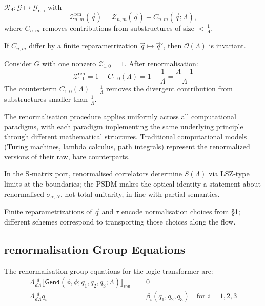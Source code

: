 \begin{definition}
\label{def:R-map}
$\mathcal{R}_\Lambda: \mathcal{G} \mapsto \mathcal{G}_{\text{ren}}$ with
\[
\mathcal{Z}_{n,m}^{\text{ren}}(\vec{q}) = \mathcal{Z}_{n,m}(\vec{q}) - C_{n,m}(\vec{q};\Lambda),
\]
where $C_{n,m}$ removes contributions from substructures of size $<\frac{1}{\Lambda}$.
\end{definition}

\begin{proposition}
\label{prop:scheme-independence}
If $C_{n,m}$ differ by a finite reparametrization $\vec{q} \mapsto \vec{q}'$, then $\mathcal{O}(\Lambda)$ is invariant.
\end{proposition}

\begin{example}
Consider $G$ with one nonzero $\mathcal{Z}_{1,0} = 1$. After renormalisation:
\[
\mathcal{Z}_{1,0}^{\text{ren}} = 1 - C_{1,0}(\Lambda) = 1 - \frac{1}{\Lambda} = \frac{\Lambda-1}{\Lambda}
\]
The counterterm $C_{1,0}(\Lambda) = \frac{1}{\Lambda}$ removes the divergent contribution from substructures smaller than $\frac{1}{\Lambda}$.
\end{example}

The renormalisation procedure applies uniformly across all computational paradigms, with each paradigm implementing the same underlying principle through different mathematical structures. Traditional computational models (Turing machines, lambda calculus, path integrals) represent the renormalized versions of their raw, bare counterparts.

In the S‑matrix port, renormalised correlators determine $S(\Lambda)$ via LSZ‑type limits at the boundaries; the PSDM makes the optical identity a statement about renormalised $\sigma_{\alpha;N}$, not total unitarity, in line with partial semantics.

Finite reparametrizations of $\vec{q}$ and $\tau$ encode normalisation choices from §1; different schemes correspond to transporting those choices along the flow.

\subsection{renormalisation Group Equations}

\begin{definition}
\label{def:rg-equations-renorm}
The renormalisation group equations for the logic transformer are:
\begin{align}
\Lambda \frac{d}{d\Lambda} \llbracket \mathsf{Gen4}(\phi,\bar{\phi};q_1,q_2,q_3;\Lambda)\rrbracket_{\text{ren}} &= 0\\
\Lambda \frac{d}{d\Lambda} q_i &= \beta_i(q_1,q_2,q_3) \quad \text{for } i = 1,2,3
\end{align}
\end{definition}

